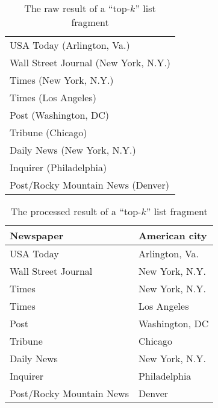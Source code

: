 \begin{table}
\centering
\caption{The raw result of a ``top-$k$'' list fragment\cite{top100Newspapers}}
\begin{tabular}{|l|}
\hline
USA Today (Arlington, Va.)\\
Wall Street Journal (New York, N.Y.)\\
Times (New York, N.Y.)\\
Times (Los Angeles)\\
Post (Washington, DC)\\
Tribune (Chicago)\\
Daily News (New York, N.Y.)\\
Inquirer (Philadelphia)\\
Post/Rocky Mountain News (Denver)\\
\hline
\end{tabular}

\label{tab:rawList}
\end{table}

\begin{table}
\centering
\caption{The processed result of a ``top-$k$'' list fragment\cite{top100Newspapers}}
\begin{tabular}{|l|l|}
\hline
\textbf{Newspaper} & \textbf{American city}\\ \hline
USA Today &Arlington, Va.\\
Wall Street Journal &New York, N.Y.\\
Times &New York, N.Y.\\
Times &Los Angeles\\
Post &Washington, DC\\
Tribune &Chicago\\
Daily News &New York, N.Y.\\
Inquirer &Philadelphia\\
Post/Rocky Mountain News &Denver\\
\hline
\end{tabular}

\label{tab:processedList}
\end{table}
%


